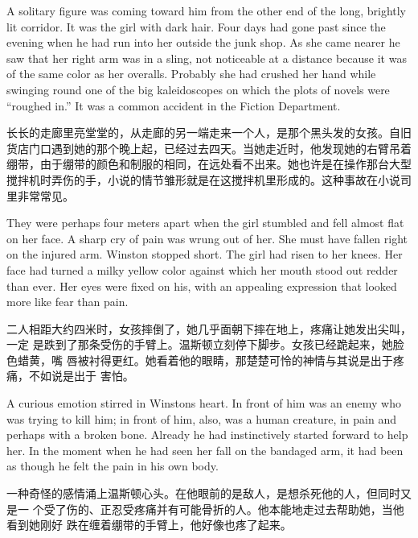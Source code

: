 \begin{paracol}{2}
A solitary figure was coming toward him from the other end of the long,
brightly lit corridor. It was the girl with dark hair. Four days had
gone past since the evening when he had run into her outside the junk
shop. As she came nearer he saw that her right arm was in a sling, not
noticeable at a distance because it was of the same color as her
overalls. Probably she had crushed her hand while swinging round one of
the big kaleidoscopes on which the plots of novels were ``roughed in.'' It
was a common accident in the Fiction Department.

\switchcolumn

长长的走廊里亮堂堂的，从走廊的另一端走来一个人，是那个黑头发的女孩。自旧货店门口遇到她的那个晚上起，已经过去四天。当她走近时，他发现她的右臂吊着绷带，由于绷带的颜色和制服的相同，在远处看不出来。她也许是在操作那台大型搅拌机时弄伤的手，小说的情节雏形就是在这搅拌机里形成的。这种事故在小说司里非常常见。

\switchcolumn*

They were perhaps four meters apart when the girl stumbled and fell
almost flat on her face. A sharp cry of pain was wrung out of her. She
must have fallen right on the injured arm. Winston stopped short. The
girl had risen to her knees. Her face had turned a milky yellow color
against which her mouth stood out redder than ever. Her eyes were fixed
on his, with an appealing expression that looked more like fear than
pain.

\switchcolumn

二人相距大约四米时，女孩摔倒了，她几乎面朝下摔在地上，疼痛让她发出尖叫，一定
是跌到了那条受伤的手臂上。温斯顿立刻停下脚步。女孩已经跪起来，她脸色蜡黄，嘴
唇被衬得更红。她看着他的眼睛，那楚楚可怜的神情与其说是出于疼痛，不如说是出于
害怕。

\switchcolumn*

A curious emotion stirred in Winston\textquotesingle s heart. In front
of him was an enemy who was trying to kill him; in front of him, also,
was a human creature, in pain and perhaps with a broken bone. Already he
had instinctively started forward to help her. In the moment when he had
seen her fall on the bandaged arm, it had been as though he felt the
pain in his own body.

\switchcolumn

一种奇怪的感情涌上温斯顿心头。在他眼前的是敌人，是想杀死他的人，但同时又是一
个受了伤的、正忍受疼痛并有可能骨折的人。他本能地走过去帮助她，当他看到她刚好
跌在缠着绷带的手臂上，他好像也疼了起来。


\end{paracol}

